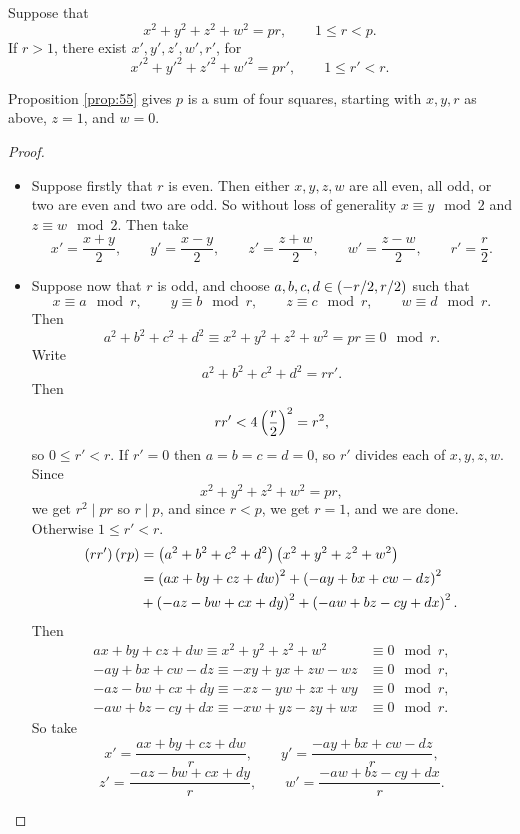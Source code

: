 \begin{proposition}
\label{prop:55}
Suppose that
$$ x^2 + y^2 + z^2 + w^2 = pr, \qquad 1 \le r < p. $$
If $ r > 1 $, there exist $ x', y', z', w', r' $, for
$$ x'^2 + y'^2 + z'^2 + w'^2 = pr', \qquad 1 \le r' < r. $$
\end{proposition}

Proposition \ref{prop:55} gives $ p $ is a sum of four squares, starting with $ x, y, r $ as above, $ z = 1 $, and $ w = 0 $.

\begin{proof}
\hfill
\begin{itemize}
\item Suppose firstly that $ r $ is even. Then either $ x, y, z, w $ are all even, all odd, or two are even and two are odd. So without loss of generality $ x \equiv y \mod 2 $ and $ z \equiv w \mod 2 $. Then take
$$ x' = \dfrac{x + y}{2}, \qquad y' = \dfrac{x - y}{2}, \qquad z' = \dfrac{z + w}{2}, \qquad w' = \dfrac{z - w}{2}, \qquad r' = \dfrac{r}{2}. $$
\item Suppose now that $ r $ is odd, and choose $ a, b, c, d \in \left( -r / 2, r / 2 \right) $ such that
$$ x \equiv a \mod r, \qquad y \equiv b \mod r, \qquad z \equiv c \mod r, \qquad w \equiv d \mod r. $$
Then
$$ a^2 + b^2 + c^2 + d^2 \equiv x^2 + y^2 + z^2 + w^2 = pr \equiv 0 \mod r. $$
Write
$$ a^2 + b^2 + c^2 + d^2 = rr'. $$
Then
$$ rr' < 4\left( \dfrac{r}{2} \right)^2 = r^2, $$
so $ 0 \le r' < r $. If $ r' = 0 $ then $ a = b = c = d = 0 $, so $ r' $ divides each of $ x, y, z, w $. Since
$$ x^2 + y^2 + z^2 + w^2 = pr, $$
we get $ r^2 \mid pr $ so $ r \mid p $, and since $ r < p $, we get $ r = 1 $, and we are done. Otherwise $ 1 \le r' < r $.
\begin{align*}
\left( rr' \right)\left( rp \right)
& = \left( a^2 + b^2 + c^2 + d^2 \right)\left( x^2 + y^2 + z^2 + w^2 \right) \\
& = \left( ax + by + cz + dw \right)^2 + \left( -ay + bx + cw - dz \right)^2 \\
& + \left( -az - bw + cx + dy \right)^2 + \left( -aw + bz - cy + dx \right)^2.
\end{align*}
Then
\begin{align*}
ax + by + cz + dw \equiv x^2 + y^2 + z^2 + w^2 & \equiv 0 \mod r, \\
-ay + bx + cw - dz \equiv -xy + yx + zw - wz & \equiv 0 \mod r, \\
-az - bw + cx + dy \equiv -xz - yw + zx + wy & \equiv 0 \mod r, \\
-aw + bz - cy + dx \equiv -xw + yz - zy + wx & \equiv 0 \mod r.
\end{align*}
So take
$$ x' = \dfrac{ax + by + cz + dw}{r}, \qquad y' = \dfrac{-ay + bx + cw - dz}{r}, $$
$$ z' = \dfrac{-az - bw + cx + dy}{r}, \qquad w' = \dfrac{-aw + bz - cy + dx}{r}. $$
\end{itemize}
\end{proof}

